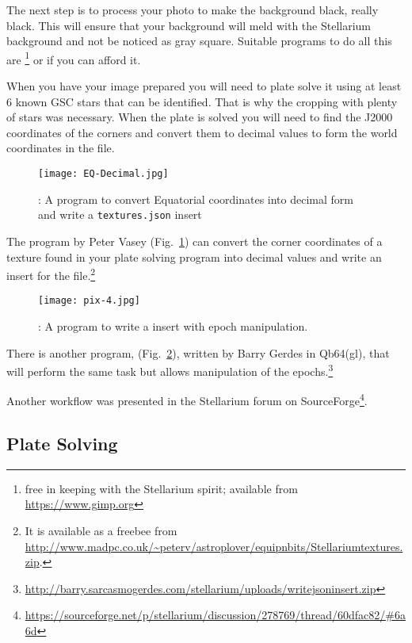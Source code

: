 The next step is to process your photo to make the background
black, really black. This will ensure that your background will meld with the
Stellarium background and not be noticed as gray square. Suitable programs to do all
this are \footnote{free in keeping with the Stellarium spirit; available from \url{https://www.gimp.org}} or
 if you can afford it.

When you have your image prepared you will need to plate solve it using
at least 6 known GSC stars that can be identified. That is why the
cropping with plenty of stars was necessary. When the plate is solved
you will need to find the J2000 coordinates of the corners and convert
them to decimal values to form the world coordinates in the
 file.

\begin{figure}[tb]
\centering\texttt{[image: EQ-Decimal.jpg]}
\caption{: A program to convert Equatorial coordinates into decimal
form and write a \texttt{textures.json} insert}
\label{fig:dso:STGen}
\end{figure}

The program  by Peter Vasey (Fig.~\ref{fig:dso:STGen}) can convert the corner coordinates of a
texture found in your plate solving program into decimal values and write an
insert for the  file.\footnote{It is available as a freebee
from
\url{http://www.madpc.co.uk/~peterv/astroplover/equipnbits/Stellariumtextures.zip}.}

\begin{figure}[t]
\centering\texttt{[image: pix-4.jpg]}
\caption{: A program to write a  insert with epoch manipulation.}
\label{fig:dso:ReadDSS}
\end{figure}

There is another program,  (Fig.~\ref{fig:dso:ReadDSS}), written by Barry Gerdes in Qb64(gl), that will perform the same
task but allows manipulation of the epochs.\footnote{
\url{http://barry.sarcasmogerdes.com/stellarium/uploads/writejsoninsert.zip}}

Another workflow was presented in the Stellarium forum on
SourceForge\footnote{\url{https://sourceforge.net/p/stellarium/discussion/278769/thread/60dfac82/#6a6d}}.

\subsection{Plate Solving}%
\label{sec:dso:plateSolving}

